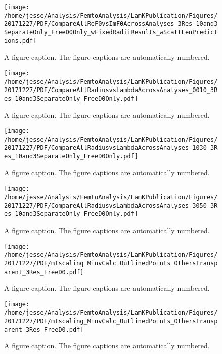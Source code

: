 \documentclass[ALICE,manyauthors]{cernphprep}
\begin{document}
\begin{figure}[b]
\texttt{[image: /home/jesse/Analysis/FemtoAnalysis/LamKPublication/Figures/20171227/PDF/CompareAllReF0vsImF0AcrossAnalyses\_3Res\_10and3SeparateOnly\_FreeD0Only\_wFixedRadiiResults\_wScattLenPredictions.pdf]}%
\caption{\label{fig:epsart} A figure caption. The figure captions are
automatically numbered.}
\end{figure}

\begin{figure}[b]
\texttt{[image: /home/jesse/Analysis/FemtoAnalysis/LamKPublication/Figures/20171227/PDF/CompareAllRadiusvsLambdaAcrossAnalyses\_0010\_3Res\_10and3SeparateOnly\_FreeD0Only.pdf]}%
\caption{\label{fig:epsart} A figure caption. The figure captions are
automatically numbered.}
\end{figure}

\begin{figure}[b]
\texttt{[image: /home/jesse/Analysis/FemtoAnalysis/LamKPublication/Figures/20171227/PDF/CompareAllRadiusvsLambdaAcrossAnalyses\_1030\_3Res\_10and3SeparateOnly\_FreeD0Only.pdf]}%
\caption{\label{fig:epsart} A figure caption. The figure captions are
automatically numbered.}
\end{figure}

\begin{figure}[b]
\texttt{[image: /home/jesse/Analysis/FemtoAnalysis/LamKPublication/Figures/20171227/PDF/CompareAllRadiusvsLambdaAcrossAnalyses\_3050\_3Res\_10and3SeparateOnly\_FreeD0Only.pdf]}%
\caption{\label{fig:epsart} A figure caption. The figure captions are
automatically numbered.}
\end{figure}

\begin{figure}[b]
\texttt{[image: /home/jesse/Analysis/FemtoAnalysis/LamKPublication/Figures/20171227/PDF/mTscaling\_MinvCalc\_OutlinedPoints\_OthersTransparent\_3Res\_FreeD0.pdf]}%
\caption{\label{fig:epsart} A figure caption. The figure captions are
automatically numbered.}
\end{figure}

\begin{figure}[b]
\texttt{[image: /home/jesse/Analysis/FemtoAnalysis/LamKPublication/Figures/20171227/PDF/mTscaling\_MinvCalc\_OutlinedPoints\_OthersTransparent\_3Res\_FreeD0.pdf]}%
\caption{\label{fig:epsart} A figure caption. The figure captions are
automatically numbered.}
\end{figure}
\end{document}
